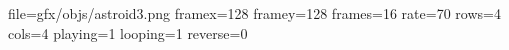 file=gfx/objs/astroid3.png
framex=128
framey=128
frames=16
rate=70
rows=4
cols=4
playing=1
looping=1
reverse=0